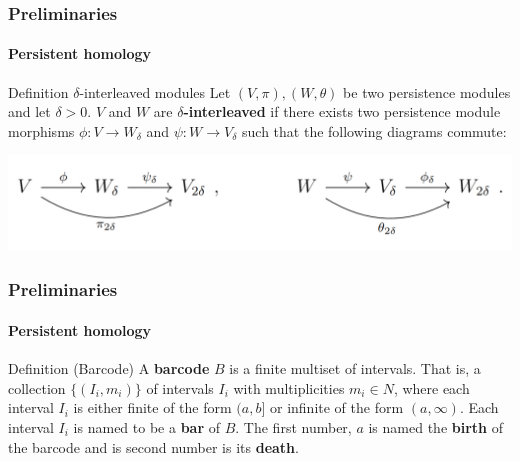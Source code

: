 \documentclass[aspectratio=169]{beamer}
\begin{document}
\begin{frame}
  \frametitle{Preliminaries}
  \framesubtitle{Persistent homology}

  \begin{block}{Definition $\delta$-interleaved modules}
    Let $ (V, \pi), (W, \theta) $ be two persistence modules and let $ \delta > 0 $. $ V $ and $ W $ are {\bf $\delta$-interleaved } if there exists two persistence module morphisms $ \phi \colon V \to W_\delta $ and $ \psi \colon W \to V_\delta $ such that the following diagrams commute:
  \end{block}
  \centering
  \includegraphics[width=0.8\linewidth]{../figures/diagrams.png}
\end{frame}

\begin{frame}
  \frametitle{Preliminaries}
  \framesubtitle{Persistent homology}
  \begin{block}{Definition (Barcode)}
        A {\bf barcode} $B$ is a finite multiset of intervals. That is, a collection $\{(I_i, m_i)\}$ of intervals $I_i$ with multiplicities $m_i \in N$, where each interval $ I_i $ is either finite of the form $(a, b]$ or infinite of the form $(a, \infty)$. Each interval $I_i$ is named to be a {\bf bar} of $B$. The first number, $ a $ is named the {\bf birth} of the barcode and is second number is its {\bf death}.
  \end{block}
\end{frame}
\end{document}
